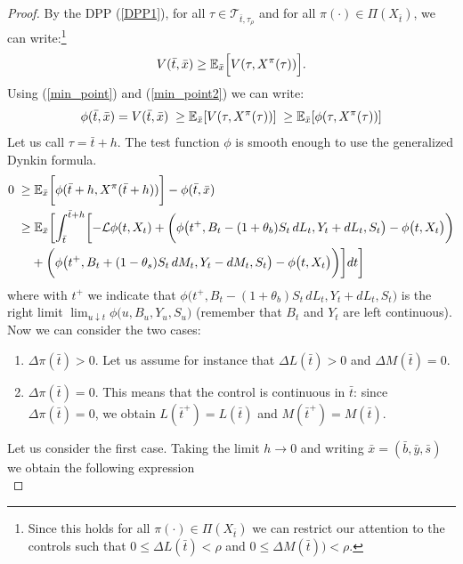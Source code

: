 \begin{proof}
By the DPP (\ref{DPP1}), for all $\tau \in \mathcal{T}_{\bar t,\tau_{\rho}}$ and for all $\pi(\cdot) \in \Pi(X_{\bar t})$, we can write:\footnote{Since this holds for 
all $\pi(\cdot) \in \Pi(X_{\bar t})$ we can restrict our attention to the controls such that $0 \leq \Delta L(\bar t) < \rho $ and $0 \leq \Delta M(\bar t)) < \rho$.}
\begin{equation}
  V(\bar t, \bar x) \geq \mathbb{E}_{\bar x} \Bigl[ V(\tau, X^{\pi}(\tau)) \Bigr].
\end{equation}
Using (\ref{min_point}) and (\ref{min_point2}) we can write:
\begin{equation*}
 \phi(\bar t, \bar x) = V(\bar t, \bar x) \; \geq \mathbb{E}_{\bar x}[V(\tau, X^{\pi}(\tau))] \; 
 \geq \mathbb{E}_{\bar x}[\phi(\tau, X^{\pi}(\tau))]
\end{equation*}
Let us call $\tau = \bar t + h$. The test function $\phi$ is smooth enough to use the generalized Dynkin formula.
\begin{align}\label{first_inequality}
 0 \; \geq & \; \mathbb{E}_{\bar x} \biggl[ \phi(\bar t +h, X^{\pi}(\bar t+h)) \biggr] - \phi(\bar t, \bar x) \\ \nonumber
   \geq & \; \mathbb{E}_{\bar x} \biggl[ \int_{\bar t}^{\bar t +h} \biggl[ -\mathcal{L} \phi(t,X_t) + \biggl( \phi \bigl( t^+, B_t - (1+\theta_b) S_t\, dL_t, Y_t + dL_t, S_t \bigr) 
     - \phi \bigl(t,X_t \bigr) \biggr) \\
   & + \biggl( \phi \bigl( t^+, B_t + (1-\theta_s) S_t\, dM_t, Y_t - dM_t, S_t \bigr) - \phi \bigl( t,X_t \bigr) \biggr) \biggr] dt \biggr]
\end{align}
where with $t^+$ we indicate that $\phi \bigl( t^+, B_t - (1+\theta_b) S_t\, dL_t, Y_t + dL_t, S_t \bigr)$ is 
the right limit $\lim_{u \downarrow t} \phi \bigl( u, B_u, Y_u, S_u \bigr)$ (remember that $B_t$ and $Y_t$ are left continuous).\\
Now we can consider the two cases:
\begin{enumerate}
 \item $\Delta \pi(\bar t)>0$. Let us assume for instance that $\Delta L(\bar t)>0$ and $\Delta M(\bar t)=0$. 
 \item $\Delta \pi(\bar t)=0$. This means that the control is continuous in $\bar t$: since $\Delta \pi(\bar t) = 0$, we obtain $L(\bar t^+) = L(\bar t)$ and
 $M(\bar t^+) = M(\bar t)$.   
\end{enumerate}
Let us consider the first case.
Taking the limit $h \to 0$ and writing $\bar x = (\bar b, \bar y, \bar s)$ we obtain the following expression
\begin{equation*}

\end{equation*}
\end{proof}
